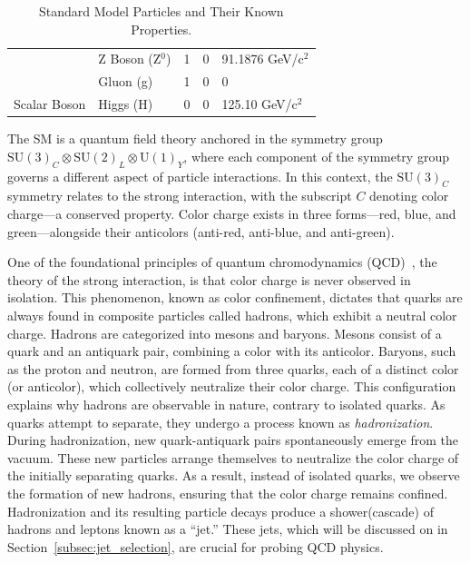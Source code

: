 \begin{table}[ht]
\begin{tabular}{|l|l|l|l|l|}
                       & Z Boson (Z\(^0\))          & 1             & 0                & 91.1876 GeV/c\(^2\)       \\ \cline{2-5}
                       & Gluon (g)             & 1             & 0                & 0                         \\ \hline
Scalar Boson           & Higgs (H)             & 0             & 0                & 125.10 GeV/c\(^2\)       \\ \hline
\end{tabular}
\caption{Standard Model Particles and Their Known Properties.}
\label{table:SMparticles}
\end{table}

\label{subsec:qcd}
The SM is a quantum field theory anchored in the symmetry group $\mathrm{SU}(3)_C \otimes \mathrm{SU}(2)_L \otimes \mathrm{U}(1)_Y$, where each component of the symmetry group governs a different aspect of particle interactions. In this context, the $\mathrm{SU}(3)_C$ symmetry relates to the strong interaction, with the subscript $C$ denoting color charge—a conserved property. Color charge exists in three forms—red, blue, and green—alongside their anticolors (anti-red, anti-blue, and anti-green).

One of the foundational principles of quantum chromodynamics (QCD)~\cite{CampbellHustonKrauss2017}, the theory of the strong interaction, is that color charge is never observed in isolation. This phenomenon, known as color confinement, dictates that quarks are always found in composite particles called hadrons, which exhibit a neutral color charge. 
Hadrons are categorized into mesons and baryons. Mesons consist of a quark and an antiquark pair, combining a color with its anticolor. Baryons, such as the proton and neutron, are formed from three quarks, each of a distinct color (or anticolor), which collectively neutralize their color charge. This configuration explains why hadrons are observable in nature, contrary to isolated quarks.
As quarks attempt to separate, they undergo a process known as \emph{hadronization}. During hadronization, new quark-antiquark pairs spontaneously emerge from the vacuum. These new particles arrange themselves to neutralize the color charge of the initially separating quarks. As a result, instead of isolated quarks, we observe the formation of new hadrons, ensuring that the color charge remains confined.
Hadronization and its resulting particle decays produce a shower(cascade) of hadrons and leptons known as a ``jet.'' These jets, which will be discussed on in Section~\ref{subsec:jet_selection}, are crucial for probing QCD physics. 

